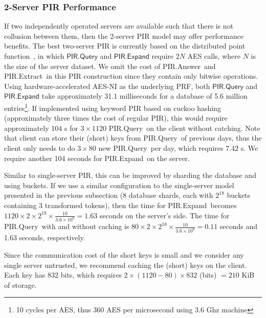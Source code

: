 \documentclass[11pt]{article} %
\newcommand{\pirqe}{\textsf{PIR.Query}}
\newcommand{\pirexpand}{\textsf{PIR.Expand}}
\newcommand{\pirans}{\textsf{PIR.Answer}}
\newcommand{\pirextract}{\textsf{PIR.Extract}}
\begin{document}
{	
	\subsubsection{2-Server PIR Performance}
	\label{subs:2PIR}
	
	
	If two independently operated servers are available such that there is not collusion between them, then the 2-server PIR model may offer performance benefits. The best two-server PIR is currently based on the distributed point function~\cite{EC:BoyGilIsh15,CCS:BoyGilIsh16}, in which 
	$\pirqe$ and  $\pirexpand$ require $2N$ AES calls, where $N$ is the size of the server dataset. We omit the cost of \pirans\ and \pirextract\ in this PIR construction since they contain only bitwise operations. Using hardware-accelerated AES-NI as the underlying PRF, both $\pirqe$ and  $\pirexpand$ take approximately 31.1 milliseconds for a database of 5.6 million entries\footnote{10 cycles per AES, thus 360 AES per microsecond using 3.6 Ghz machine}. If implemented using keyword PIR based on cuckoo hashing (approximately three times the cost of regular PIR), this would require approximately 104 s for $3\times 1120$ \pirqe\ on the client without catching. Note that client can store their (short) keys from \pirqe\ of previous days, thus the client only needs to do $3\times 80$ new \pirqe\ per day, which requires $7.42$ s. We require another 104 seconds for \pirexpand\ on the server. %
	
	Similar to single-server PIR, this can be improved by sharding the database and using buckets. If we use a similar configuration to the single-server model presented in the previous subsection (8 database shards, each with $2^{18}$ buckets containing 3 transformed tokens), then the time for \pirexpand\ becomes $1120 \times 2 \times 2^{18} \times \frac{10}{3.6\times10^9} =1.63$ seconds on the server's side. The time for \pirqe\ with and without caching is $80 \times 2 \times 2^{18} \times \frac{10}{3.6\times10^9} = 0.11$ seconds and 1.63 seconds, respectively. 
	
	Since the communication cost of the short keys is small and we consider any single server untrusted, we recommend caching the (short) keys on the client. Each key has $832$ bits, which requires $2 \times (1120-80) \times 832$ (bits) $= 210$ KiB of storage.
	
	
}
\end{document}
